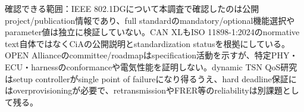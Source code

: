 \begin{claimboundary}
確認できる範囲：IEEE 802.1DGについて本調査で確認したのは公開project/publication情報であり、full standardのmandatory/optional機能選択やparameter値は独立に検証していない。CAN XLもISO 11898-1:2024のnormative text自体ではなくCiAの公開説明とstandardization statusを根拠にしている。OPEN Allianceのcommittee/roadmapはspecification活動を示すが、特定PHY・ECU・harnessのconformanceや電気性能を証明しない。dynamic TSN QoS研究はsetup controllerがsingle point of failureになり得るうえ、hard deadline保証にはoverprovisioningが必要で、retransmissionやFRER等のreliabilityは別課題として残る。\autocite{src-0b4e94520719,src-0d68a9a04e3d,src-470ecee4f411,src-4df5f45556b0,src-4e0a35202b0f,src-b7cb6b22b2e4}
\end{claimboundary}
